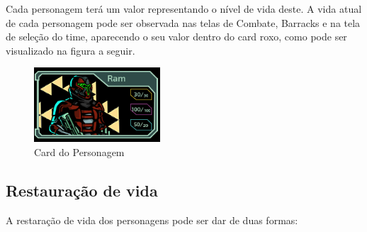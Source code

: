 \documentclass[11pt]{article} %
\begin{document}
Cada personagem terá um valor representando o nível de vida deste. A vida atual de cada personagem pode ser observada nas telas de Combate, Barracks e na tela de seleção do time, aparecendo o seu valor dentro do card roxo, como pode ser visualizado na figura a seguir.

\begin{figure}[!htp]
\centering
\includegraphics[scale=0.75]{res/card.png}
\caption{Card do Personagem}
\label{Card do Personagem}
\end{figure}

\subsection{Restauração de vida}

A restaração de vida dos personagens pode ser dar de duas formas:
\end{document}
